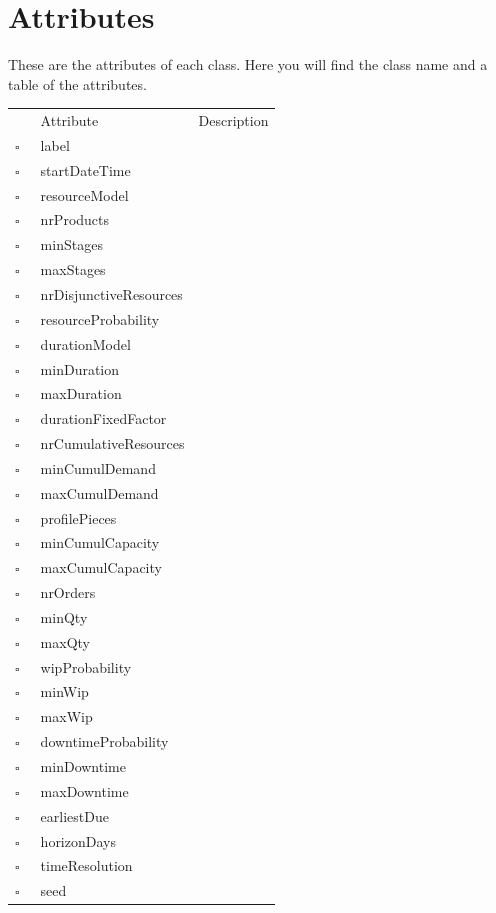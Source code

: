 \chapter{Attributes}
These are the attributes of each class. Here you will find the class name and a table of the attributes.     
\begin{table}
\caption{AbstractDataGeneratorProperty  }

\begin{longtable}{llp{8cm}}
& Attribute & Description \\
$\square$\ & label &  \\
$\square$\ & startDateTime &  \\
$\square$\ & resourceModel &  \\
$\square$\ & nrProducts &  \\
$\square$\ & minStages &  \\
$\square$\ & maxStages &  \\
$\square$\ & nrDisjunctiveResources &  \\
$\square$\ & resourceProbability &  \\
$\square$\ & durationModel &  \\
$\square$\ & minDuration &  \\
$\square$\ & maxDuration &  \\
$\square$\ & durationFixedFactor &  \\
$\square$\ & nrCumulativeResources &  \\
$\square$\ & minCumulDemand &  \\
$\square$\ & maxCumulDemand &  \\
$\square$\ & profilePieces &  \\
$\square$\ & minCumulCapacity &  \\
$\square$\ & maxCumulCapacity &  \\
$\square$\ & nrOrders &  \\
$\square$\ & minQty &  \\
$\square$\ & maxQty &  \\
$\square$\ & wipProbability &  \\
$\square$\ & minWip &  \\
$\square$\ & maxWip &  \\
$\square$\ & downtimeProbability &  \\
$\square$\ & minDowntime &  \\
$\square$\ & maxDowntime &  \\
$\square$\ & earliestDue &  \\
$\square$\ & horizonDays &  \\
$\square$\ & timeResolution &  \\
$\square$\ & seed &  \\
\end{longtable}
\label{attr:AbstractDataGeneratorProperty}
\end{table}

